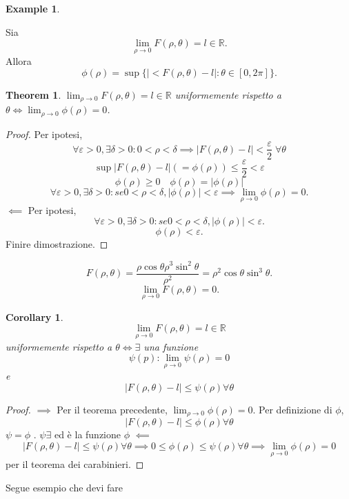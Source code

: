 \documentclass{article}
\theoremstyle{plain}
\newtheorem{thm}{Theorem}[section]
\newtheorem{cor}{Corollary}
\theoremstyle{definition}
\newtheorem{exmp}{Example}[section]
\theoremstyle{remark}
\begin{document}
\begin{exmp}
    
\end{exmp}

\vspace{10pt}

Sia \[\lim_{\rho\to0}F(\rho,\theta)=l\in\mathbb{R}.\] Allora \[\phi(\rho)=\sup\{|<F(\rho,\theta)-l|:\theta\in[0,2\pi]\}.\]

\begin{bxthm}
\begin{thm}
    $\lim_{\rho\to0}F(\rho,\theta)=l\in\mathbb{R}$ uniformemente rispetto a $\theta \iff \lim_{\rho\to0}\phi(\rho)=0$.
\end{thm}
\end{bxthm}
\begin{proof}
    Per ipotesi, \[\forall\varepsilon>0,\exists\delta>0:0<\rho<\delta\implies|F(\rho,\theta)-l|<\frac{\varepsilon}{2}\;\forall\theta\]
    \[\sup|F(\rho,\theta)-l| (=\phi(\rho))\leq\dfrac{\varepsilon}{2}<\varepsilon\]
    \[\phi(\rho)\geq0\quad \phi(\rho)=|\phi(\rho)|\]
    \[\forall\varepsilon>0,\exists\delta>0: se 0<\rho<\delta, |\phi(\rho)|<\varepsilon\implies \lim_{\rho\to0}\phi(\rho)=0.\]
    $\impliedby$
    Per ipotesi, \[\forall\varepsilon>0,\exists\delta>0: se 0<\rho<\delta, |\phi(\rho)|<\varepsilon.\]
    \[\phi(\rho)<\varepsilon.\]
    Finire dimostrazione.
\end{proof}
\[F(\rho,\theta)=\dfrac{\rho\cos\theta\rho^3\sin^2\theta}{\rho^2}=\rho^2\cos\theta\sin^3\theta. \]
\[\lim_{\rho\to0}F(\rho,\theta)=0.\]

\begin{bxthm}
\begin{cor}
    \[\lim_{\rho\to0}F(\rho,\theta)=l\in\mathbb{R}\] uniformemente rispetto a $\theta \iff \exists$ una funzione \[\psi(p):\lim_{\rho\to0}\psi(\rho)=0\] e \[|F(\rho,\theta)-l|\leq\psi(\rho)\forall\theta\]
\end{cor}
\end{bxthm}
\begin{proof}
    $\implies$ Per il teorema precedente, $\lim_{\rho\to0}\phi(\rho)=0$. Per definizione di $\phi$, \[|F(\rho,\theta)-l|\leq\phi(\rho)\forall\theta\]
    $\psi=\phi$ . $\psi \exists$ ed è la funzione $\phi$
    $\impliedby$ \[|F(\rho,\theta)-l|\leq\psi(\rho)\forall\theta\implies 0\leq\phi(\rho)\leq\psi(\rho)\forall\theta\implies\lim_{\rho\to0}\phi(\rho)=0\] per il teorema dei carabinieri.
\end{proof}

Segue esempio che devi fare
\end{document}
